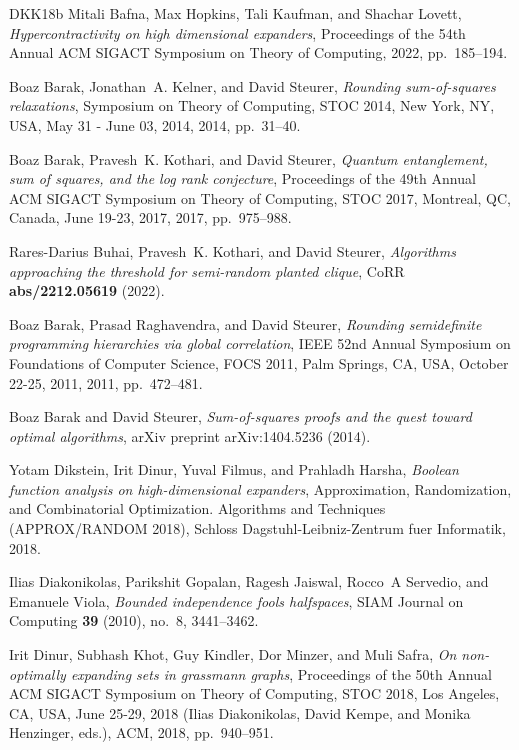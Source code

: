 \documentclass[11pt]{article}
\theoremstyle{definition}
\begin{document}
\begin{thebibliography}{DKK{\etalchar{+}}18b}
Mitali Bafna, Max Hopkins, Tali Kaufman, and Shachar Lovett,
  \emph{Hypercontractivity on high dimensional expanders}, Proceedings of the
  54th Annual ACM SIGACT Symposium on Theory of Computing, 2022, pp.~185--194.

Boaz Barak, Jonathan~A. Kelner, and David Steurer, \emph{Rounding
  sum-of-squares relaxations}, Symposium on Theory of Computing, {STOC} 2014,
  New York, NY, USA, May 31 - June 03, 2014, 2014, pp.~31--40.

Boaz Barak, Pravesh~K. Kothari, and David Steurer, \emph{Quantum entanglement,
  sum of squares, and the log rank conjecture}, Proceedings of the 49th Annual
  {ACM} {SIGACT} Symposium on Theory of Computing, {STOC} 2017, Montreal, QC,
  Canada, June 19-23, 2017, 2017, pp.~975--988.

Rares{-}Darius Buhai, Pravesh~K. Kothari, and David Steurer, \emph{Algorithms
  approaching the threshold for semi-random planted clique}, CoRR
  \textbf{abs/2212.05619} (2022).

Boaz Barak, Prasad Raghavendra, and David Steurer, \emph{Rounding semidefinite
  programming hierarchies via global correlation}, {IEEE} 52nd Annual Symposium
  on Foundations of Computer Science, {FOCS} 2011, Palm Springs, CA, USA,
  October 22-25, 2011, 2011, pp.~472--481.

Boaz Barak and David Steurer, \emph{Sum-of-squares proofs and the quest toward
  optimal algorithms}, arXiv preprint arXiv:1404.5236 (2014).

Yotam Dikstein, Irit Dinur, Yuval Filmus, and Prahladh Harsha, \emph{Boolean
  function analysis on high-dimensional expanders}, Approximation,
  Randomization, and Combinatorial Optimization. Algorithms and Techniques
  (APPROX/RANDOM 2018), Schloss Dagstuhl-Leibniz-Zentrum fuer Informatik, 2018.

Ilias Diakonikolas, Parikshit Gopalan, Ragesh Jaiswal, Rocco~A Servedio, and
  Emanuele Viola, \emph{Bounded independence fools halfspaces}, SIAM Journal on
  Computing \textbf{39} (2010), no.~8, 3441--3462.

Irit Dinur, Subhash Khot, Guy Kindler, Dor Minzer, and Muli Safra, \emph{On
  non-optimally expanding sets in grassmann graphs}, Proceedings of the 50th
  Annual {ACM} {SIGACT} Symposium on Theory of Computing, {STOC} 2018, Los
  Angeles, CA, USA, June 25-29, 2018 (Ilias Diakonikolas, David Kempe, and
  Monika Henzinger, eds.), {ACM}, 2018, pp.~940--951.


\end{thebibliography}
\end{document}
